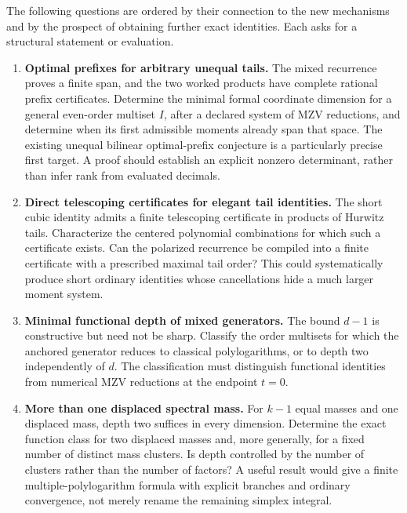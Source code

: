 The following questions are ordered by their connection to the
new mechanisms and by the prospect of obtaining further exact
identities. Each asks for a structural statement or evaluation.

\begin{enumerate}[label=\textbf{Q\arabic*.},leftmargin=*]
\item \textbf{Optimal prefixes for arbitrary unequal tails.}
The mixed recurrence proves a finite span, and the two worked
products have complete rational prefix certificates.
Determine the minimal formal coordinate dimension for a
general even-order multiset \(I\), after a declared system of
MZV reductions, and determine when its first admissible
moments already span that space. The existing unequal
bilinear optimal-prefix conjecture is a particularly precise
first target. A proof should establish an explicit nonzero
determinant, rather than infer rank from evaluated decimals.

\item \textbf{Direct telescoping certificates for elegant tail identities.}
The short cubic identity admits a finite telescoping
certificate in products of Hurwitz tails. Characterize the
centered polynomial combinations for which such a certificate
exists. Can the polarized recurrence be compiled into a
finite certificate with a prescribed maximal tail order?
This could systematically produce short ordinary identities
whose cancellations hide a much larger moment system.

\item \textbf{Minimal functional depth of mixed generators.}
The bound \(d-1\) is constructive but need not be sharp.
Classify the order multisets for which the anchored generator
reduces to classical polylogarithms, or to depth two
independently of \(d\). The classification must distinguish
functional identities from numerical MZV reductions at the
endpoint \(t=0\).

\item \textbf{More than one displaced spectral mass.}
For \(k-1\) equal masses and one displaced mass, depth two
suffices in every dimension. Determine the exact function
class for two displaced masses and, more generally, for a
fixed number of distinct mass clusters. Is depth controlled
by the number of clusters rather than the number of factors?
A useful result would give a finite multiple-polylogarithm
formula with explicit branches and ordinary convergence,
not merely rename the remaining simplex integral.


\end{enumerate}
